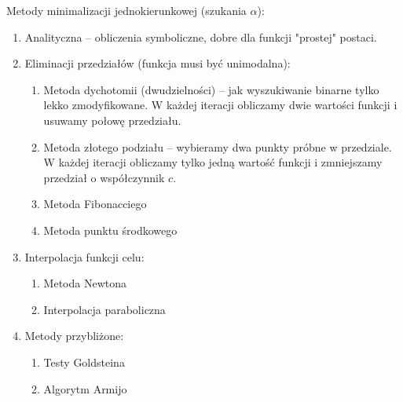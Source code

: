 \documentclass[12pt]{article}
\begin{document}
Metody minimalizacji jednokierunkowej (szukania $\alpha$):
\begin{enumerate}
	\item Analityczna -- obliczenia symboliczne, dobre dla funkcji "prostej" postaci.
	\item Eliminacji przedziałów (funkcja musi być unimodalna):
	\begin{enumerate}
		\item Metoda dychotomii (dwudzielności) -- jak wyszukiwanie binarne tylko lekko zmodyfikowane. W każdej iteracji obliczamy dwie wartości funkcji i usuwamy połowę przedziału.
		\item Metoda złotego podziału -- wybieramy dwa punkty próbne w przedziale. W każdej iteracji obliczamy tylko jedną wartość funkcji i zmniejszamy przedział o współczynnik $c$.
		\item Metoda Fibonacciego
		\item Metoda punktu środkowego
	\end{enumerate}
	\item Interpolacja funkcji celu:
	\begin{enumerate}
		\item Metoda Newtona
		\item Interpolacja paraboliczna
	\end{enumerate}
	\item Metody przybliżone:
	\begin{enumerate}
		\item Testy Goldsteina
		\item Algorytm Armijo
	\end{enumerate}
\end{enumerate}
\end{document}
